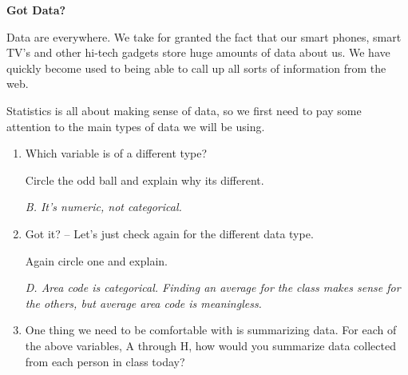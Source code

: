 \def\theTopic{Descriptive Stats }
\def\dayNum{2}

\begin{center}
{\bf {\large Got Data?}}
\end{center}
 
Data are everywhere.  We take for granted the fact that our smart
phones, smart TV's and other hi-tech gadgets store
huge amounts of data about us.  We have quickly become used to being
able to call up all sorts of information from the web. 

Statistics is all about making sense of data, so we first need to pay
some attention to the main types of data we will be using.

\begin{enumerate}
  \item Which  variable is of a  different type?
     Circle the odd ball and explain why its different.
\begin{students}
    \vspace{1cm}    
\end{students}

\begin{key}
  {\it B.  It's numeric, not categorical.}       
\end{key}

\item Got it?  -- Let's just check again for the different data type.
   Again circle one and explain.
\begin{students}
    \vspace{1cm}
\end{students}

\begin{key}
  {\it D.  Area code is categorical. Finding an average for the class
    makes sense for the others, but average area code is meaningless.}       
\end{key}
\item \label{summry}One thing we need to be comfortable with is
  summarizing data.  For each of the above variables, A through H, how
  would you summarize data collected from each person in class today?
\end{enumerate}
 \newpage

